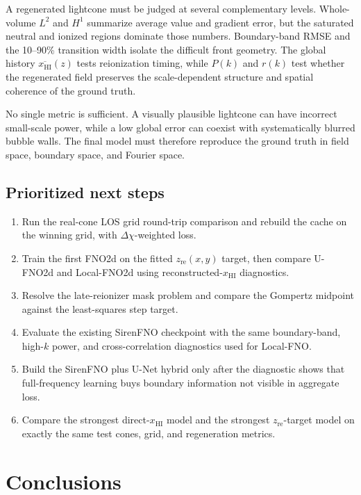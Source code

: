 \documentclass[11pt,a4paper]{article}
\newcommand{\xhi}{x_{\mathrm{HI}}}
\newcommand{\zre}{z_{\mathrm{re}}}
\newcommand{\Ltwo}{L^2}
\newcommand{\Hone}{H^1}
\begin{document}
A regenerated lightcone must be judged at several complementary levels.
Whole-volume \(\Ltwo\) and \(\Hone\) summarize average value and gradient
error, but the saturated neutral and ionized regions dominate those numbers.
Boundary-band RMSE and the 10--90\% transition width isolate the difficult
front geometry. The global history \(\overline{\xhi}(z)\) tests reionization
timing, while \(P(k)\) and \(r(k)\) test whether the regenerated field preserves
the scale-dependent structure and spatial coherence of the ground truth.

No single metric is sufficient. A visually plausible lightcone can have
incorrect small-scale power, while a low global error can coexist with
systematically blurred bubble walls. The final model must therefore reproduce
the ground truth in field space, boundary space, and Fourier space.

\subsection{Prioritized next steps}

\begin{enumerate}
  \item Run the real-cone LOS grid round-trip comparison and rebuild the cache
  on the winning grid, with \(\Delta\chi\)-weighted loss.
  \item Train the first FNO2d on the fitted \(\zre(x,y)\) target, then compare
  U-FNO2d and Local-FNO2d using reconstructed-\(\xhi\) diagnostics.
  \item Resolve the late-reionizer mask problem and compare the Gompertz
  midpoint against the least-squares step target.
  \item Evaluate the existing SirenFNO checkpoint with the same boundary-band,
  high-\(k\) power, and cross-correlation diagnostics used for Local-FNO.
  \item Build the SirenFNO plus U-Net hybrid only after the diagnostic shows
  that full-frequency learning buys boundary information not visible in
  aggregate loss.
  \item Compare the strongest direct-\(\xhi\) model and the strongest
  \(\zre\)-target model on exactly the same test cones, grid, and regeneration
  metrics.
\end{enumerate}

\section{Conclusions}
\end{document}
